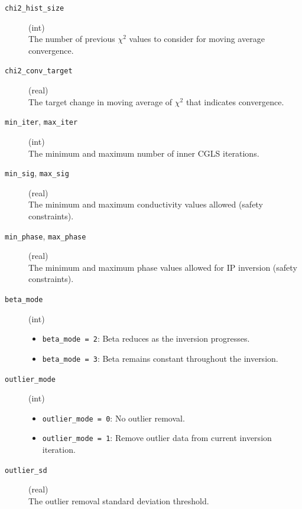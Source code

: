 \documentclass[a4paper,12pt]{article}
\begin{document}
\begin{description}
    \item[\texttt{chi2\_hist\_size}] (int)\hfill \\
          The number of previous $\chi^2$ values to consider for moving average convergence.

    \item[\texttt{chi2\_conv\_target}] (real)\hfill \\
          The target change in moving average of $\chi^2$ that indicates convergence.

    \item[\texttt{min\_iter}, \texttt{max\_iter}] (int)\hfill \\
          The minimum and maximum number of inner CGLS iterations.

    \item[\texttt{min\_sig}, \texttt{max\_sig}] (real)\hfill \\
          The minimum and maximum conductivity values allowed (safety constraints).

    \item[\texttt{min\_phase}, \texttt{max\_phase}] (real)\hfill \\
          The minimum and maximum phase values allowed for IP inversion (safety constraints).

    \item[\texttt{beta\_mode}] (int)\hfill
          \begin{itemize}
              \item \texttt{beta\_mode = 2}: Beta reduces as the inversion progresses.
              \item \texttt{beta\_mode = 3}: Beta remains constant throughout the inversion.
          \end{itemize}

    \item[\texttt{outlier\_mode}] (int)\hfill
          \begin{itemize}
              \item \texttt{outlier\_mode = 0}: No outlier removal.
              \item \texttt{outlier\_mode = 1}: Remove outlier data from current inversion iteration.
          \end{itemize}

    \item[\texttt{outlier\_sd}] (real)\hfill \\
          The outlier removal standard deviation threshold.
\end{description}
\end{document}
